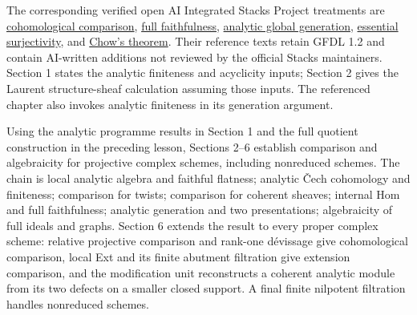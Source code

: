 \documentclass[11pt]{article}
\begin{document}
The corresponding verified open AI Integrated Stacks Project treatments
are
\href{https://kokunoyumeto.github.io/stacks-zh-hans-cn/en/gaga.html\#gaga-section-proof-gaga-cohomology}{cohomological
comparison},
\href{https://kokunoyumeto.github.io/stacks-zh-hans-cn/en/gaga.html\#gaga-section-proof-gaga-fully-faithful}{full
faithfulness},
\href{https://kokunoyumeto.github.io/stacks-zh-hans-cn/en/gaga.html\#gaga-lemma-projective-analytic-global-generation}{analytic
global generation},
\href{https://kokunoyumeto.github.io/stacks-zh-hans-cn/en/gaga.html\#gaga-section-completion-gaga-essential-surjectivity}{essential
surjectivity}, and
\href{https://kokunoyumeto.github.io/stacks-zh-hans-cn/en/gaga.html\#gaga-theorem-chow-closed-analytic-projective}{Chow's
theorem}. Their reference texts retain GFDL 1.2 and contain AI-written
additions not reviewed by the official Stacks maintainers. Section 1
states the analytic finiteness and acyclicity inputs; Section 2 gives
the Laurent structure-sheaf calculation assuming those inputs. The
referenced chapter also invokes analytic finiteness in its generation
argument.

Using the analytic programme results in Section 1 and the full quotient
construction in the preceding lesson, Sections 2--6 establish comparison
and algebraicity for projective complex schemes, including nonreduced
schemes. The chain is local analytic algebra and faithful flatness;
analytic Čech cohomology and finiteness; comparison for twists;
comparison for coherent sheaves; internal Hom and full faithfulness;
analytic generation and two presentations; algebraicity of full ideals
and graphs. Section 6 extends the result to every proper complex scheme:
relative projective comparison and rank-one dévissage give cohomological
comparison, local Ext and its finite abutment filtration give extension
comparison, and the modification unit reconstructs a coherent analytic
module from its two defects on a smaller closed support. A final finite
nilpotent filtration handles nonreduced schemes.
\end{document}
